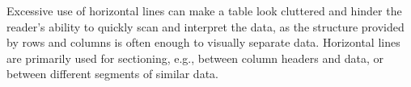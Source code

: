 


\noindent Excessive use of horizontal lines can make a table look cluttered and hinder the reader's ability to quickly scan and interpret the data, as the structure provided by rows and columns is often enough to visually separate data.
Horizontal lines are primarily used for sectioning, e.g., between column headers and data, or between different segments of similar data.
